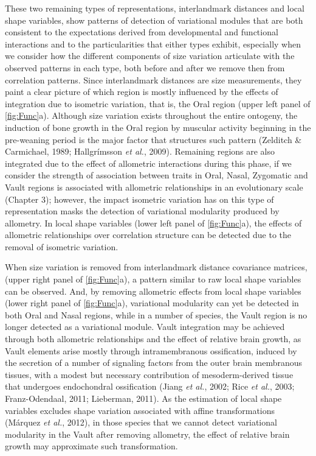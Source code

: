 \documentclass[12pt,twoside]{report}
\begin{document}
These two remaining types of representations, interlandmark distances
and local shape variables, show patterns of detection of variational
modules that are both consistent to the expectations derived from
developmental and functional interactions and to the particularities
that either types exhibit, especially when we consider how the different
components of size variation articulate with the observed patterns in
each type, both before and after we remove then from correlation
patterns. Since interlandmark distances are size measurements, they
paint a clear picture of which region is mostly influenced by the
effects of integration due to isometric variation, that is, the Oral
region (upper left panel of \autoref{fig:Func}a). Although size
variation exists throughout the entire ontogeny, the induction of bone
growth in the Oral region by muscular activity beginning in the
pre-weaning period is the major factor that structures such pattern
(Zelditch \& Carmichael, 1989; Hallgrímsson \emph{et al.}, 2009).
Remaining regions are also integrated due to the effect of allometric
interactions during this phase, if we consider the strength of
association between traits in Oral, Nasal, Zygomatic and Vault regions
is associated with allometric relationships in an evolutionary scale
(Chapter 3); however, the impact isometric variation has on this type of
representation masks the detection of variational modularity produced by
allometry. In local shape variables (lower left panel of
\autoref{fig:Func}a), the effects of allometric relationships over
correlation structure can be detected due to the removal of isometric
variation.

When size variation is removed from interlandmark distance covariance
matrices, (upper right panel of \autoref{fig:Func}a), a pattern similar
to raw local shape variables can be observed. And, by removing
allometric effects from local shape variables (lower right panel of
\autoref{fig:Func}a), variational modularity can yet be detected in both
Oral and Nasal regions, while in a number of species, the Vault region
is no longer detected as a variational module. Vault integration may be
achieved through both allometric relationships and the effect of
relative brain growth, as Vault elements arise mostly through
intramembranous ossification, induced by the secretion of a number of
signaling factors from the outer brain membranous tissues, with a modest
but necessary contribution of mesoderm-derived tissue that undergoes
endochondral ossification (Jiang \emph{et al.}, 2002; Rice \emph{et
al.}, 2003; Franz-Odendaal, 2011; Lieberman, 2011). As the estimation of
local shape variables excludes shape variation associated with affine
transformations (Márquez \emph{et al.}, 2012), in those species that we
cannot detect variational modularity in the Vault after removing
allometry, the effect of relative brain growth may approximate such
transformation.
\end{document}

